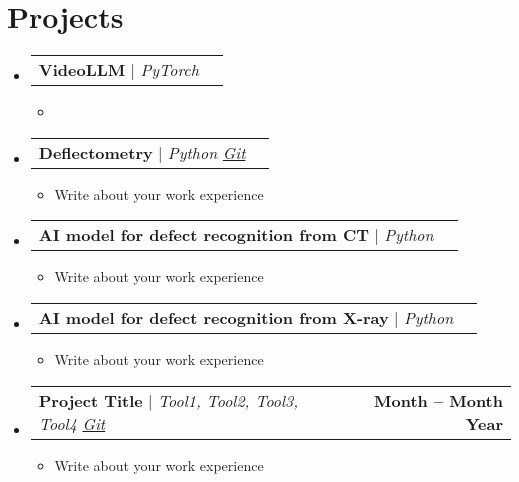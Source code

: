 \documentclass[letterpaper,11pt]{article}
\makeatletter
\newcommand{\resumeItem}[1]{
  \item\small{
    {#1 \vspace{-2pt}}
  }
}
\newcommand{\resumeProjectHeading}[2]{
    \item
    \begin{tabular*}{1.001\textwidth}{l@{\extracolsep{\fill}}r}
      \small#1 & \textbf{\small #2}\\
    \end{tabular*}\vspace{-7pt}
}
\newcommand{\resumeSubHeadingListStart}{\begin{itemize}[leftmargin=0.0in, label={}]}
\newcommand{\resumeSubHeadingListEnd}{\end{itemize}}
\newcommand{\resumeItemListStart}{\begin{itemize}}
\newcommand{\resumeItemListEnd}{\end{itemize}\vspace{-5pt}}
\makeatother
\begin{document}
\section{Projects}
    \vspace{-6pt}
    \resumeSubHeadingListStart
    \resumeProjectHeading
          {\textbf{VideoLLM} $|$ \emph{PyTorch \href{}{}}}{}
          \resumeItemListStart
            \resumeItem{ }
          \resumeItemListEnd
          \vspace{-14pt}
    \resumeProjectHeading
          {\textbf{Deflectometry} $|$ \emph{Python \href{https://github.com/}{Git}}}{}
          \resumeItemListStart
            \resumeItem{ Write about your work experience}
          \resumeItemListEnd
          \vspace{-14pt}
    \resumeProjectHeading
          {\textbf{AI model for defect recognition from CT} $|$ \emph{Python \href{}{}}}{}
          \resumeItemListStart
            \resumeItem{ Write about your work experience}
          \resumeItemListEnd
          \vspace{-14pt}
    \resumeProjectHeading
        {\textbf{AI model for defect recognition from X-ray} $|$ \emph{Python \href{}{}}}{}
        \resumeItemListStart
        \resumeItem{ Write about your work experience}
        \resumeItemListEnd
        \vspace{-14pt}    
  \resumeProjectHeading
  {\textbf{Project Title} $|$ \emph{Tool1, Tool2, Tool3, Tool4 \href{https://github.com/}{Git}}}{Month -- Month Year}
  \resumeItemListStart
    \resumeItem{ Write about your work experience}
  \resumeItemListEnd
  \vspace{-14pt}
    \resumeSubHeadingListEnd
\end{document}
